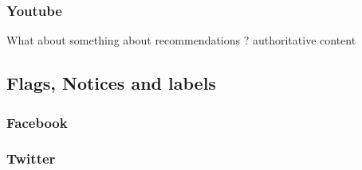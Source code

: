 \documentclass[11pt,a4paper]{article}
\begin{document}

\subsubsection{Youtube}

{\color{pink} What about something about recommendations ? authoritative content  }

\subsection{Flags, Notices and labels}

\subsubsection{Facebook}

\subsubsection{Twitter}
\end{document}
